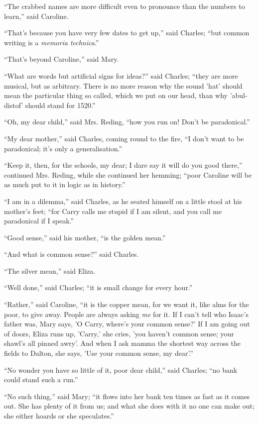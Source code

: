 ``The crabbed names are more difficult even to pronounce than
the numbers to learn,'' said Caroline.

``That's because you have very few dates to get up,'' said
Charles; ``but common writing is a \emph{memoria technica}.''

``That's beyond Caroline,'' said Mary.

``What are words but artificial signs for ideas?'' said
Charles; ``they are more musical, but as arbitrary. There is no
more reason why the sound 'hat' should mean the particular thing
so called, which we put on our head, than why 'abul-distof' should
stand for 1520.''

``Oh, my dear child,'' said Mrs. Reding, ``how you run
on! Don't be paradoxical.''

``My dear mother,'' said Charles, coming round to the fire,
``I don't want to be paradoxical; it's only a generalisation.''

``Keep it, then, for the schools, my dear; I dare say it will
do you good there,'' continued Mrs. Reding, while she continued
her hemming; ``poor Caroline will be as much put to it in logic as
in history.''

``I am in a dilemma,'' said Charles, as he seated himself
on a little stool at his mother's feet; ``for Carry calls me
stupid if I am silent, and you call me paradoxical if I speak.''

``Good sense,'' said his mother, ``is the golden
mean.''

``And what is common sense?'' said Charles.

``The silver mean,'' said Eliza.

``Well done,'' said Charles; ``it is small change for
every hour.''

``Rather,'' said Caroline, ``it is the copper mean, for
we want it, like alms for the poor, to give away. People are always
asking \emph{me} for it. If I can't tell who Isaac's father was, Mary
says, 'O Carry, where's your common sense?' If I am going out of
doors, Eliza runs up, 'Carry,' she cries, 'you haven't common sense;
your shawl's all pinned awry'. And when I ask mamma the shortest way
across the fields to Dalton, she says, 'Use your common sense, my
dear'.''

``No wonder you have so little of it, poor dear child,''
said Charles; ``no bank could stand such a run.''

``No such thing,'' said Mary; ``it flows into her bank
ten times as fast as it comes out. She has plenty of it from us; and
what she does with it no one can make out; she either hoards or she
speculates.''

